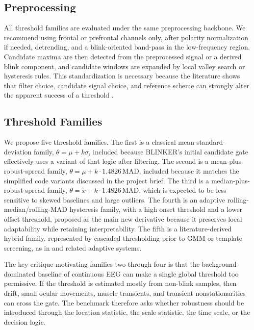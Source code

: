 \subsection{Preprocessing}

All threshold families are evaluated under the same preprocessing backbone. We recommend using frontal or prefrontal channels only, after polarity normalization if needed, detrending, and a blink-oriented band-pass in the low-frequency region. Candidate maxima are then detected from the preprocessed signal or a derived blink component, and candidate windows are expanded by local valley search or hysteresis rules. This standardization is necessary because the literature shows that filter choice, candidate signal choice, and reference scheme can strongly alter the apparent success of a threshold \citep{chang2016detection,kleifges2017blinker,tran2021detection,zhang2023method}.

\subsection{Threshold Families}

We propose five threshold families. The first is a classical mean-standard-deviation family, \(\theta = \mu + k\sigma\), included because BLINKER's initial candidate gate effectively uses a variant of that logic after filtering. The second is a mean-plus-robust-spread family, \(\theta = \mu + k \cdot 1.4826\,\mathrm{MAD}\), included because it matches the simplified code variants discussed in the project brief. The third is a median-plus-robust-spread family, \(\theta = \tilde{x} + k \cdot 1.4826\,\mathrm{MAD}\), which is expected to be less sensitive to skewed baselines and large outliers. The fourth is an adaptive rolling-median/rolling-MAD hysteresis family, with a high onset threshold and a lower offset threshold, proposed as the main new derivative because it preserves local adaptability while retaining interpretability. The fifth is a literature-derived hybrid family, represented by cascaded thresholding prior to GMM or template screening, as in \citet{cao2021unsupervised} and related adaptive systems.

The key critique motivating families two through four is that the background-dominated baseline of continuous EEG can make a single global threshold too permissive. If the threshold is estimated mostly from non-blink samples, then drift, small ocular movements, muscle transients, and transient nonstationarities can cross the gate. The benchmark therefore asks whether robustness should be introduced through the location statistic, the scale statistic, the time scale, or the decision logic.

